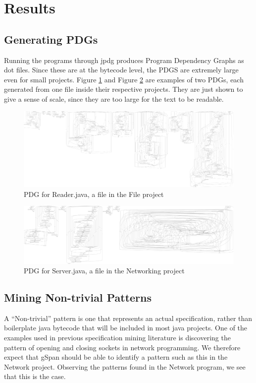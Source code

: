 \documentclass[12pt]{article}
\begin{document}
\section{Results}
\subsection{Generating PDGs}
Running the programs through jpdg produces Program Dependency Graphs as dot files. Since these are at the bytecode level, the PDGS are extremely large even for small projects. Figure \ref{reader_pdg} and Figure \ref{server_pdg} are examples of two PDGs, each generated from one file inside their respective projects. They are just shown to give a sense of scale, since they are too large for the text to be readable.

\begin{figure}[H]
\centerline{
\includegraphics[width=\linewidth]{patterns/reader_pdg_full.png}
}
\caption{\label{reader_pdg}
    PDG for Reader.java, a file in the File project
}
\end{figure}


\begin{figure}[H]
\centerline{
\includegraphics[width=\linewidth]{patterns/full_network_small.png}
}
\caption{\label{server_pdg}
    PDG for Server.java, a file in the Networking project
}
\end{figure}

\subsection{Mining Non-trivial Patterns}
A ``Non-trivial'' pattern is one that represents an actual specification, rather than boilerplate java bytecode that will be included in most java projects. One of the examples used in previous specification mining literature is discovering the pattern of opening and closing sockets in network programming. We therefore expect that gSpan should be able to identify a pattern such as this in the Network project. Observing the patterns found in the Network program, we see that this is the case.
\end{document}
